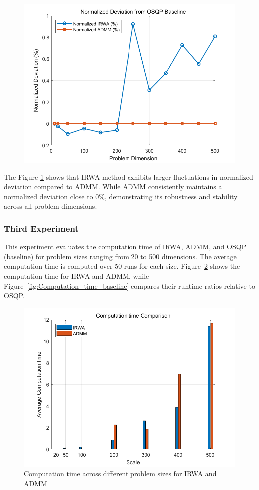 \documentclass{article}
\begin{document}
\begin{figure}[H]
    \centering
    \includegraphics[width=0.75\linewidth]{fig/ADMM_vs_IRWA_of_optimal_value.png}
    \caption{}
    \label{fig:ADMM_vs_IRWA_normalized_deviation}
\end{figure}

The Figure \ref{fig:ADMM_vs_IRWA_normalized_deviation} shows that IRWA method exhibits larger fluctuations in normalized deviation compared to ADMM. While ADMM consistently maintains a normalized deviation close to 0\%, demonstrating its robustness and stability across all problem dimensions.

\subsubsection{Third Experiment}

This experiment evaluates the computation time of IRWA, ADMM, and OSQP (baseline) for problem sizes ranging from 20 to 500 dimensions. The average computation time is computed over 50 runs for each size. Figure~\ref{fig:Computation_time} shows the computation time for IRWA and ADMM, while Figure~\ref{fig:Computation_time_baseline} compares their runtime ratios relative to OSQP.

\begin{figure}[H]
    \centering
    \includegraphics[width=0.75\linewidth]{fig/Computation_time.png}
    \caption{Computation time across different problem sizes for IRWA and ADMM}
    \label{fig:Computation_time}
\end{figure}
\end{document}
